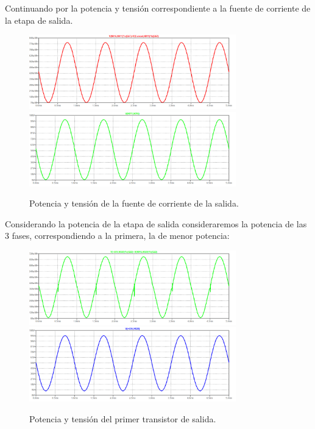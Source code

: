 Continuando por la potencia y tensión correspondiente a la fuente de corriente de la etapa de salida.
\begin{figure}[H]
	\centering
	\includegraphics[width=0.8\textwidth]{ImagenesSimulaciones/PCSVBE.png}
		\includegraphics[width=0.8\textwidth]{ImagenesSimulaciones/VCSVBE.png}
	\caption{Potencia y tensión de la fuente de corriente de la salida.}
	\label{fig:pcsvbe}
\end{figure}
Considerando la potencia de la etapa de salida consideraremos la potencia de las 3 fases, correspondiendo a la primera, la de menor potencia:
\begin{figure}[H]
	\centering
	\includegraphics[width=0.8\textwidth]{ImagenesSimulaciones/PO1.png}
		\includegraphics[width=0.8\textwidth]{ImagenesSimulaciones/VO1.png}
	\caption{Potencia y tensión del primer transistor de salida.}
	\label{fig:po1}
\end{figure}
